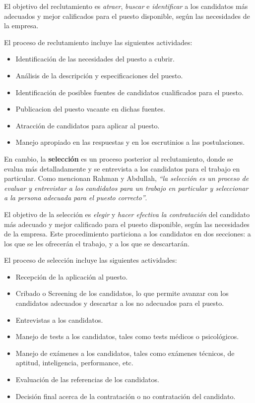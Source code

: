 \documentclass[12pt,a4paper]{article}
\begin{document}
\begin{sloppypar}
El objetivo del reclutamiento es \textit{atraer}, \textit{buscar} e \textit{identificar} a los candidatos más adecuados y mejor calificados para el puesto disponible, según las necesidades de la empresa. 

El proceso de reclutamiento incluye las siguientes actividades\cite{seleccion_reclutamiento_2}:
\begin{itemize}
\item Identificación de las necesidades del puesto a cubrir. 
\item Análisis de la descripción y especificaciones del puesto.
\item Identificación de posibles fuentes de candidatos cualificados para el puesto.
\item Publicacion del puesto vacante en dichas fuentes.
\item Atracción de candidatos para aplicar al puesto.
\item Manejo apropiado en las respuestas y en los escrutinios a las postulaciones.
\end{itemize}

\cleardoublepage    %

En cambio, la \textbf{selección} es un proceso posterior al reclutamiento, donde se evalua más detalladamente y se entrevista a los candidatos para el trabajo en particular. Como mencionan Rahman y Abdullah, \textit{``la selección es un proceso de evaluar y entrevistar a los candidatos para un trabajo en particular y seleccionar a la persona adecuada para el puesto correcto''}\cite{seleccion_reclutamiento_2}.

El objetivo de la selección es \textit{elegir} y \textit{hacer efectiva la contratación} del candidato más adecuado y mejor calificado para el puesto disponible, según las necesidades de la empresa. Este procedimiento particiona a los candidatos en dos secciones: a los que se les ofrecerán el trabajo, y a los que se descartarán.

El proceso de selección incluye las siguientes actividades\cite{seleccion_reclutamiento_2}: 
\begin{itemize}
\item Recepción de la aplicación al puesto.
\item Cribado o Screening de los candidatos, lo que permite avanzar con los candidatos adecuados y descartar a los no adecuados para el puesto.
\item Entrevistas a los candidatos.
\item Manejo de tests a los candidatos, tales como tests médicos o psicológicos. 
\item Manejo de exámenes a los candidatos, tales como exámenes técnicos, de aptitud, inteligencia, performance, etc.
\item Evaluación de las referencias de los candidatos.
\item Decisión final acerca de la contratación o no contratación del candidato.
\end{itemize}


\end{sloppypar}
\end{document}
